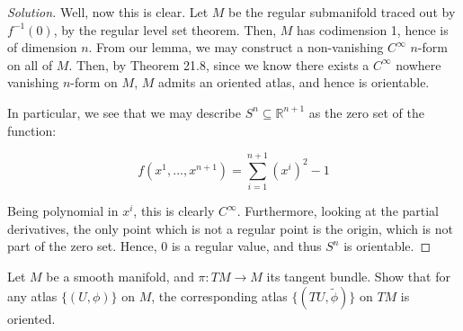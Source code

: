 \documentclass[10pt]{article}
\theoremstyle{nonumberplain}%
\newenvironment{problem}[2][]{\begin{trivlist}
\item[\hskip \labelsep {\bfseries #1}\hskip \labelsep {\bfseries #2.}]}{\end{trivlist}}
\begin{document}
\begin{proof}[Solution]
Well, now this is clear. Let $M$ be the regular submanifold traced out by $f^{-1}(0)$, by the regular level set theorem. Then, $M$ has codimension 1, hence is of dimension $n$. From our lemma, we may construct a non-vanishing $C^\infty$ $n$-form on all of $M$. Then, by Theorem 21.8, since we know there exists a $C^\infty$ nowhere vanishing $n$-form on $M$, $M$ admits an oriented atlas, and hence is orientable.

In particular, we see that we may describe $S^n \subseteq \mathbb{R}^{n+1}$ as the zero set of the function:

$$ f(x^1,...,x^{n+1}) = \sum_{i=1}^{n+1} (x^i)^2 - 1 $$

Being polynomial in $x^i$, this is clearly $C^\infty$. Furthermore, looking at the partial derivatives, the only point which is not a regular point is the origin, which is not part of the zero set. Hence, $0$ is a regular value, and thus $S^n$ is orientable.
\end{proof}

\begin{problem}{Question 2}

Let $M$ be a smooth manifold, and $\pi: TM \to M$ its tangent bundle. Show that for any atlas $\{ (U, \phi ) \}$ on $M$, the corresponding atlas $\{ (TU, \tilde{\phi}) \}$ on $TM$ is oriented.

\end{problem}
\end{document}
